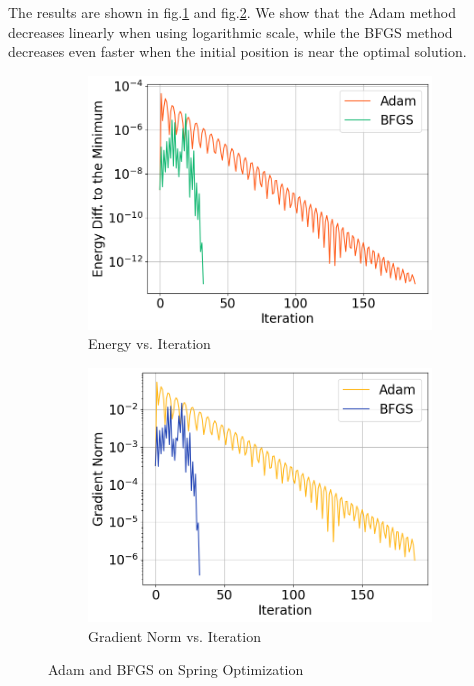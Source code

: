 \documentclass[12pt]{article}
\newcommand{\0}{\boldsymbol{0}}
\begin{document}
The results are shown in fig.\ref{fig:energy}  and fig.\ref{fig:gradient_norm}. We show that the Adam method decreases linearly when using logarithmic scale, while the BFGS method decreases even faster when the initial position is near the optimal solution.
\begin{figure}[h!]
    \centering
    \begin{subfigure}[b]{0.45\textwidth}
        \centering
        \includegraphics[width=\textwidth]{../img/problem_2/energy.png}
        \caption{Energy vs. Iteration}
        \label{fig:energy}
        
    \end{subfigure}
    \hfill
    \begin{subfigure}[b]{0.45\textwidth}
        \centering
        \includegraphics[width=\textwidth]{../img/problem_2/gradient_norm.png}
        \caption{Gradient Norm vs. Iteration}
        \label{fig:gradient_norm}
    \end{subfigure}
    \label{fig:adam_vs_bfgs}
    \caption{Adam and BFGS on Spring Optimization}
\end{figure}
\end{document}
